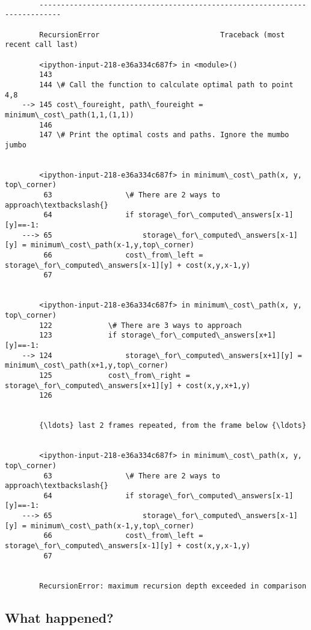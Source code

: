 \documentclass[11pt]{article}
\begin{document}
    \begin{Verbatim}[commandchars=\\\{\}]

        ---------------------------------------------------------------------------

        RecursionError                            Traceback (most recent call last)

        <ipython-input-218-e36a334c687f> in <module>()
        143 
        144 \# Call the function to calculate optimal path to point 4,8
    --> 145 cost\_foureight, path\_foureight = minimum\_cost\_path(1,1,(1,1))
        146 
        147 \# Print the optimal costs and paths. Ignore the mumbo jumbo


        <ipython-input-218-e36a334c687f> in minimum\_cost\_path(x, y, top\_corner)
         63                 \# There are 2 ways to approach\textbackslash{}
         64                 if storage\_for\_computed\_answers[x-1][y]==-1:
    ---> 65                     storage\_for\_computed\_answers[x-1][y] = minimum\_cost\_path(x-1,y,top\_corner)
         66                 cost\_from\_left = storage\_for\_computed\_answers[x-1][y] + cost(x,y,x-1,y)
         67 


        <ipython-input-218-e36a334c687f> in minimum\_cost\_path(x, y, top\_corner)
        122             \# There are 3 ways to approach
        123             if storage\_for\_computed\_answers[x+1][y]==-1:
    --> 124                 storage\_for\_computed\_answers[x+1][y] = minimum\_cost\_path(x+1,y,top\_corner)
        125             cost\_from\_right = storage\_for\_computed\_answers[x+1][y] + cost(x,y,x+1,y)
        126 


        {\ldots} last 2 frames repeated, from the frame below {\ldots}


        <ipython-input-218-e36a334c687f> in minimum\_cost\_path(x, y, top\_corner)
         63                 \# There are 2 ways to approach\textbackslash{}
         64                 if storage\_for\_computed\_answers[x-1][y]==-1:
    ---> 65                     storage\_for\_computed\_answers[x-1][y] = minimum\_cost\_path(x-1,y,top\_corner)
         66                 cost\_from\_left = storage\_for\_computed\_answers[x-1][y] + cost(x,y,x-1,y)
         67 


        RecursionError: maximum recursion depth exceeded in comparison

    \end{Verbatim}

    \subsection{What happened?}\label{what-happened}
\end{document}
